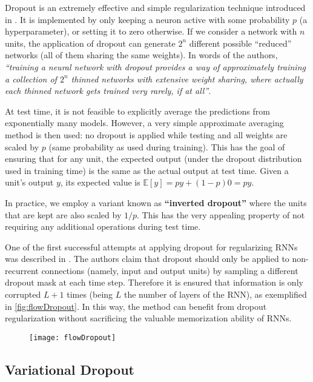 Dropout is an extremely effective and simple regularization technique introduced in \cite{srivastava14a}. It is implemented by only keeping a neuron active with some probability $p$ (a hyperparameter), or setting it to zero otherwise. If we consider a network with $n$ units, the application of dropout can generate $2^n$ different possible ``reduced'' networks (all of them sharing the same weights). In words of the authors, \textit{``training a neural network with dropout provides a way of approximately training a collection of $2^n$ thinned networks with extensive weight sharing, where actually each thinned network gets trained very rarely, if at all''}.

At test time, it is not feasible to explicitly average the predictions from exponentially many models. However, a very simple approximate averaging method is then used: no dropout is applied while testing and all weights are scaled by $p$ (same probability as used during training). This has the goal of ensuring that for any unit, the expected output (under the dropout distribution used in training time) is the same as the actual output at test time. Given a unit's output $y$, its expected value is $\mathbb{E}[y]=py+(1-p)0=py$.

In practice, we employ a variant known as \textbf{``inverted dropout''} where the units that are kept are also scaled by $1/p$. This has the very appealing property of not requiring any additional operations during test time.

One of the first successful attempts at applying dropout for regularizing RNNs was described in \cite{zaremba2014recurrent}. The authors claim that dropout should only be applied to non-recurrent connections (namely, input and output units) by sampling a different dropout mask at each time step. Therefore it is ensured that information is only corrupted $L+1$ times (being $L$ the number of layers of the RNN), as exemplified in \autoref{fig:flowDropout}. In this way, the method can benefit from dropout regularization without sacrificing the valuable memorization ability of RNNs.

\begin{figure}[H]
	\centering
	\texttt{[image: flowDropout]}
	\label{fig:flowDropout}
\end{figure}

\subsection{Variational Dropout}

